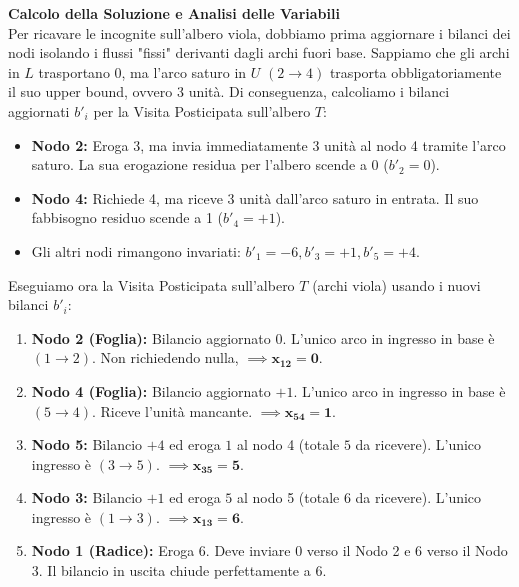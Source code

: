 \documentclass[12pt, a4paper]{article}
\begin{document}
	\vspace{0.4cm}
	\textbf{Calcolo della Soluzione e Analisi delle Variabili}\\
	Per ricavare le incognite sull'albero viola, dobbiamo prima aggiornare i bilanci dei nodi isolando i flussi "fissi" derivanti dagli archi fuori base.
	Sappiamo che gli archi in $L$ trasportano 0, ma l'arco saturo in $U$ $(2\to4)$ trasporta obbligatoriamente il suo upper bound, ovvero 3 unità. 
	Di conseguenza, calcoliamo i bilanci aggiornati $b'_i$ per la Visita Posticipata sull'albero $T$:
	\begin{itemize}
		\item \textbf{Nodo 2:} Eroga 3, ma invia immediatamente 3 unità al nodo 4 tramite l'arco saturo. La sua erogazione residua per l'albero scende a 0 ($b'_2 = 0$).
		\item \textbf{Nodo 4:} Richiede 4, ma riceve 3 unità dall'arco saturo in entrata. Il suo fabbisogno residuo scende a 1 ($b'_4 = +1$).
		\item Gli altri nodi rimangono invariati: $b'_1 = -6, b'_3 = +1, b'_5 = +4$.
	\end{itemize}
	
	Eseguiamo ora la Visita Posticipata sull'albero $T$ (archi viola) usando i nuovi bilanci $b'_i$:
	\begin{enumerate}
		\item \textbf{Nodo 2 (Foglia):} Bilancio aggiornato $0$. L'unico arco in ingresso in base è $(1\to2)$. Non richiedendo nulla, $\implies \mathbf{x_{12} = 0}$.
		\item \textbf{Nodo 4 (Foglia):} Bilancio aggiornato $+1$. L'unico arco in ingresso in base è $(5\to4)$. Riceve l'unità mancante. $\implies \mathbf{x_{54} = 1}$.
		\item \textbf{Nodo 5:} Bilancio $+4$ ed eroga $1$ al nodo 4 (totale $5$ da ricevere). L'unico ingresso è $(3\to5)$. $\implies \mathbf{x_{35} = 5}$.
		\item \textbf{Nodo 3:} Bilancio $+1$ ed eroga $5$ al nodo 5 (totale $6$ da ricevere). L'unico ingresso è $(1\to3)$. $\implies \mathbf{x_{13} = 6}$.
		\item \textbf{Nodo 1 (Radice):} Eroga $6$. Deve inviare 0 verso il Nodo 2 e 6 verso il Nodo 3. Il bilancio in uscita chiude perfettamente a 6.
	\end{enumerate}
	
\end{document}
